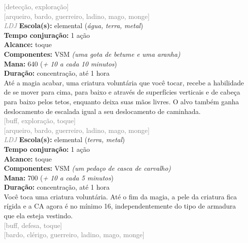 \documentclass{RPG_Adventure}[2021/10/20]
\begin{document}
{\scriptsize \textcolor{gray}{[detecção, exploração]\\}}
{\scriptsize \textcolor{gray}{[arqueiro, bardo, guerreiro, ladino, mago, monge]\\}}
{\tiny \textcolor{gray}{\textit{LDJ}}}\jump{}
{\small \t \textbf{Escola(s):} elemental (\textit{água, terra, metal})\\\t \textbf{Tempo conjuração:} 1 ação\\\t \textbf{Alcance:} toque\\\t \textbf{Componentes:} VSM \textit{(uma gota de betume e uma aranha)}\\\t \textbf{Mana:} 640 (\textit{+ 10 a cada 10 minutos})\\\t \textbf{Duração:} concentração, até 1 hora\\}
{\normalsize Até a magia acabar, uma criatura voluntária que você tocar, recebe a habilidade de se mover para cima, para baixo e através de superfícies verticais e de cabeça para baixo pelos tetos, enquanto deixa suas mãos livres. O alvo também ganha deslocamento de escalada igual a seu deslocamento de caminhada.\\}
{\scriptsize \textcolor{gray}{[buff, exploração, toque]\\}}
{\scriptsize \textcolor{gray}{[arqueiro, bardo, guerreiro, ladino, mago, monge]\\}}
{\tiny \textcolor{gray}{\textit{LDJ}}}\jump{}
{\small \t \textbf{Escola(s):} elemental (\textit{terra, metal})\\\t \textbf{Tempo conjuração:} 1 ação\\\t \textbf{Alcance:} toque\\\t \textbf{Componentes:} VSM \textit{(um pedaço de casca de carvalho)}\\\t \textbf{Mana:} 700 (\textit{+ 10 a cada 5 minutos})\\\t \textbf{Duração:} concentração, até 1 hora\\}
{\normalsize Você toca uma criatura voluntária. Até o fim da magia, a pele da criatura fica rígida e a CA agora é no mínimo 16, independentemente do tipo de armadura que ela esteja vestindo.\\}
{\scriptsize \textcolor{gray}{[buff, defesa, toque]\\}}
{\scriptsize \textcolor{gray}{[bardo, clérigo, guerreiro, ladino, mago, monge]\\}}
\end{document}
